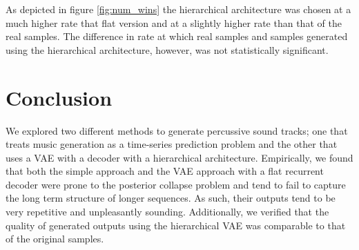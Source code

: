 \documentclass[10pt,twocolumn]{article}
\begin{document}
As depicted in figure \ref{fig:num_wins} the hierarchical architecture was chosen at a much higher rate that flat version and at a slightly higher rate than that of the real samples. The difference in rate at which real samples and samples generated using the hierarchical architecture, however, was not statistically significant.

\section{Conclusion}

We explored two different methods to generate percussive sound tracks; one that treats music generation as a time-series prediction problem and the other that uses a VAE with a decoder with a hierarchical architecture. Empirically, we found that both the simple approach and the VAE approach with a flat recurrent decoder were prone to the posterior collapse problem and tend to fail to capture the long term structure of longer sequences. As such, their outputs tend to be very repetitive and unpleasantly sounding. Additionally, we verified that the quality of generated outputs using the hierarchical VAE was comparable to that of the original samples.

\pagebreak



\end{document}
